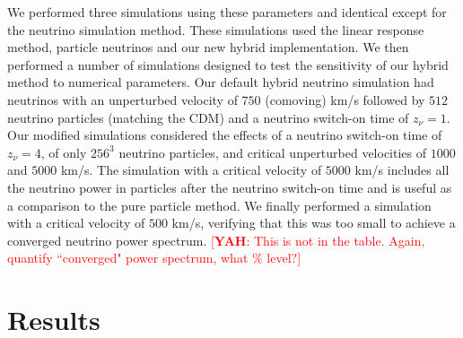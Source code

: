 \documentclass[useAMS, usenatbib]{mnras}
\newcommand{\yah}[1]{{\textcolor{red}{[{\bf YAH}: #1]}}}
\begin{document}
We performed three simulations using these parameters and identical except for the neutrino simulation method. These simulations used the linear response method, particle neutrinos and our new hybrid implementation. We then performed a number of simulations designed to test the sensitivity of our hybrid method to numerical parameters. Our default hybrid neutrino simulation had neutrinos with an unperturbed velocity of $750$ (comoving) km/s followed by $512$ neutrino particles (matching the CDM) and a neutrino switch-on time of $z_\nu = 1$. Our modified simulations considered the effects of a neutrino switch-on time of $z_\nu = 4$, of only $256^3$ neutrino particles, and critical unperturbed velocities of $1000$ and $5000$ km/s. The simulation with a critical velocity of $5000$ km/s includes all the neutrino power in particles after the neutrino switch-on time and is useful as a comparison to the pure particle method. We finally performed a simulation with a critical velocity of $500$ km/s, verifying that this was too small to achieve a converged neutrino power spectrum. \yah{This is not in the table. Again, quantify ``converged" power spectrum, what \% level?}

\section{Results}
\label{sec:results}
\end{document}
